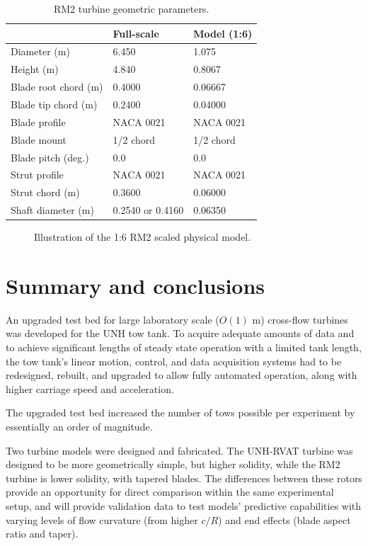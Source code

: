 \begin{table}[ht]
    \centering
    \begin{tabular}{l|l|l}
        & Full-scale & Model (1:6) \\
        \hline 
        Diameter (m)   & 6.450 & 1.075 \\ 
        Height (m)     & 4.840 & 0.8067 \\ 
        Blade root chord (m) & 0.4000 & 0.06667 \\ 
        Blade tip chord (m)  & 0.2400 & 0.04000 \\ 
        Blade profile & NACA 0021 & NACA 0021 \\ 
        Blade mount & 1/2 chord & 1/2 chord \\ 
        Blade pitch (deg.) & 0.0 & 0.0 \\ 
        Strut profile & NACA 0021 & NACA 0021 \\ 
        Strut chord (m) & 0.3600 & 0.06000 \\ 
        Shaft diameter (m) & 0.2540 \cite{Beam2011} or 0.4160 \cite{Hill2014} & 0.06350\\ 
    \end{tabular}
    \caption{RM2 turbine geometric parameters.}
    \label{tab:turb-geom}
\end{table}

\begin{figure}[ht]
    \centering
    \caption{Illustration of the 1:6 RM2 scaled physical model.}
    \label{fig:RM2-drawing}
\end{figure}


\section{Summary and conclusions}

An upgraded test bed for large laboratory scale ($O(1)$ m) cross-flow turbines
was developed for the UNH tow tank. To acquire adequate amounts of data and to
achieve significant lengths of steady state operation with a limited tank
length, the tow tank's linear motion, control, and data acquisition systems had
to be redesigned, rebuilt, and upgraded to allow fully automated operation,
along with higher carriage speed and acceleration.

The upgraded test bed increased the number of tows possible per experiment by
essentially an order of magnitude.

Two turbine models were designed and fabricated. The UNH-RVAT turbine was
designed to be more geometrically simple, but higher solidity, while the RM2
turbine is lower solidity, with tapered blades. The differences between these
rotors provide an opportunity for direct comparison within the same experimental
setup, and will provide validation data to test models' predictive capabilities
with varying levels of flow curvature (from higher $c/R$) and end effects (blade
aspect ratio and taper).
